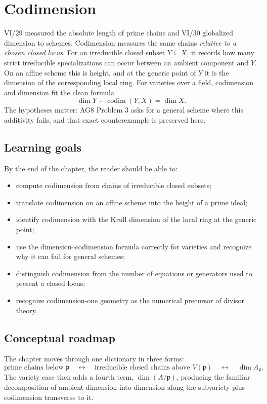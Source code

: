\chapter{Codimension}\label{ch:vi31-codimension}

VI/29 measured the absolute length of prime chains and VI/30 globalized dimension to schemes.  Codimension measures the
same chains \emph{relative to a chosen closed locus}.  For an irreducible closed subset $Y\subseteq X$, it records how
many strict irreducible specializations can occur between an ambient component and $Y$.  On an affine scheme this is
height, and at the generic point of $Y$ it is the dimension of the corresponding local ring.  For varieties over a
field, codimension and dimension fit the clean formula
\[
 \dim Y+\operatorname{codim}(Y,X)=\dim X.
\]
The hypotheses matter: AG8 Problem 3 asks for a general scheme where this additivity fails, and that exact counterexample
is preserved here.

\section*{Learning goals}
By the end of the chapter, the reader should be able to:
\begin{itemize}
\item compute codimension from chains of irreducible closed subsets;
\item translate codimension on an affine scheme into the height of a prime ideal;
\item identify codimension with the Krull dimension of the local ring at the generic point;
\item use the dimension--codimension formula correctly for varieties and recognize why it can fail for general schemes;
\item distinguish codimension from the number of equations or generators used to present a closed locus;
\item recognize codimension-one geometry as the numerical precursor of divisor theory.
\end{itemize}

\section*{Conceptual roadmap}
The chapter moves through one dictionary in three forms:
\[
\text{prime chains below }\mathfrak p
\quad\longleftrightarrow\quad
\text{irreducible closed chains above }V(\mathfrak p)
\quad\longleftrightarrow\quad
\dim A_{\mathfrak p}.
\]
The variety case then adds a fourth term, $\dim(A/\mathfrak p)$, producing the familiar decomposition of ambient dimension
into dimension along the subvariety plus codimension transverse to it.

